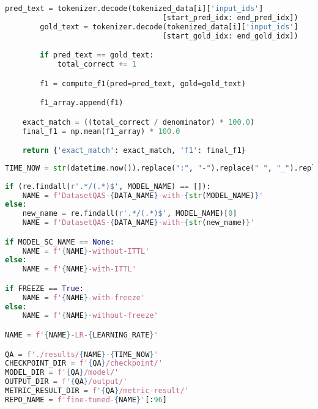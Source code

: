 \begin{lstlisting}[language=Python, caption=Perancangan metrik komputasi untuk penilaian \emph{question answering task}]
        pred_text = tokenizer.decode(tokenized_data[i]['input_ids']
                                    [start_pred_idx: end_pred_idx])
        gold_text = tokenizer.decode(tokenized_data[i]['input_ids']
                                    [start_gold_idx: end_gold_idx])

        if pred_text == gold_text:
            total_correct += 1

        f1 = compute_f1(pred=pred_text, gold=gold_text)

        f1_array.append(f1)

    exact_match = ((total_correct / denominator) * 100.0)
    final_f1 = np.mean(f1_array) * 100.0

    return {'exact_match': exact_match, 'f1': final_f1}
\end{lstlisting}

\begin{lstlisting}[language=Python, caption=Perancangan penamaan eksperimen \emph{question answering task}]
TIME_NOW = str(datetime.now()).replace(":", "-").replace(" ", "_").replace(".", "_")
    
if (re.findall(r'.*/(.*)$', MODEL_NAME) == []): 
    NAME = f'DatasetQAS-{DATA_NAME}-with-{str(MODEL_NAME)}'
else:
    new_name = re.findall(r'.*/(.*)$', MODEL_NAME)[0]
    NAME = f'DatasetQAS-{DATA_NAME}-with-{str(new_name)}'

if MODEL_SC_NAME == None:
    NAME = f'{NAME}-without-ITTL'
else:
    NAME = f'{NAME}-with-ITTL'

if FREEZE == True:
    NAME = f'{NAME}-with-freeze'
else:
    NAME = f'{NAME}-without-freeze'

NAME = f'{NAME}-LR-{LEARNING_RATE}'

QA = f'./results/{NAME}-{TIME_NOW}'
CHECKPOINT_DIR = f'{QA}/checkpoint/'
MODEL_DIR = f'{QA}/model/'
OUTPUT_DIR = f'{QA}/output/'
METRIC_RESULT_DIR = f'{QA}/metric-result/'
REPO_NAME = f'fine-tuned-{NAME}'[:96]
\end{lstlisting}

